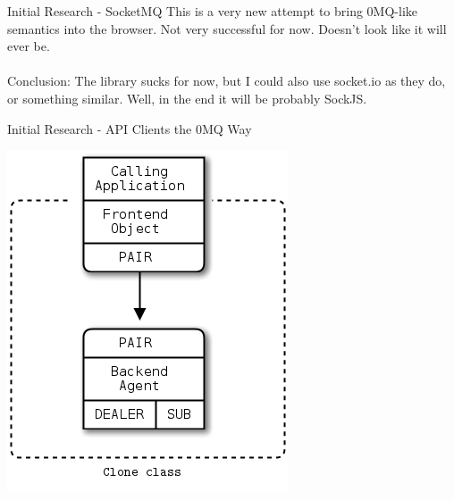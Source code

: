 \documentclass{beamer}
\begin{document}
\begin{frame}{Initial Research - SocketMQ}
  This is a very new attempt to bring 0MQ-like semantics into the browser.
  Not very successful for now. Doesn't look like it will ever be.
  \\~\\
  Conclusion: The library sucks for now, but I could also use socket.io
  as they do, or something similar. Well, in the end it will be probably SockJS.
\end{frame}

\begin{frame}{Initial Research - API Clients the 0MQ Way}
  \begin{center}
	\includegraphics[width=\textwidth,height=0.8\textheight,keepaspectratio]{Resources/multithreading-api.png}
  \end{center}
\end{frame}
\end{document}
